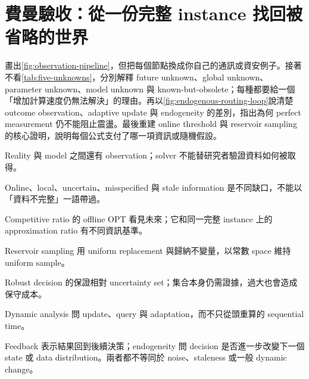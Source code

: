 \documentclass[11pt,a4paper,oneside,openany]{book}
\begin{document}
\section{費曼驗收：從一份完整 instance 找回被省略的世界}
\begin{feynmancheck}
畫出\cref{fig:observation-pipeline}，但把每個節點換成你自己的通訊或資安例子。接著不看\cref{tab:five-unknowns}，分別解釋 future unknown、global unknown、parameter unknown、model unknown 與 known-but-obsolete；每種都要給一個「增加計算速度仍無法解決」的理由。再以\cref{fig:endogenous-routing-loop}說清楚 outcome observation、adaptive update 與 endogeneity 的差別，指出為何 perfect measurement 仍不能阻止震盪。最後重建 online threshold 與 reservoir sampling 的核心證明，說明每個公式支付了哪一項資訊或隨機假設。
\end{feynmancheck}
\begin{chapterrecap}
\item Reality 與 model 之間還有 observation；solver 不能替研究者驗證資料如何被取得。
\item Online、local、uncertain、misspecified 與 stale information 是不同缺口，不能以「資料不完整」一語帶過。
\item Competitive ratio 的 offline OPT 看見未來；它和同一完整 instance 上的 approximation ratio 有不同資訊基準。
\item Reservoir sampling 用 uniform replacement 與歸納不變量，以常數 space 維持 uniform sample。
\item Robust decision 的保證相對 uncertainty set；集合本身仍需證據，過大也會造成保守成本。
\item Dynamic analysis 問 update、query 與 adaptation，而不只從頭重算的 sequential time。
\item Feedback 表示結果回到後續決策；endogeneity 問 decision 是否進一步改變下一個 state 或 data distribution。兩者都不等同於 noise、staleness 或一般 dynamic change。
\end{chapterrecap}
\end{document}
